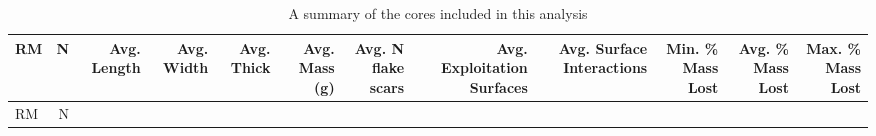 \documentclass[]{elsarticle} %
\begin{document}
\begin{longtable}[]{@{}lrrrrrrrrrrr@{}}
\caption{A summary of the cores included in this analysis
\label{table2}}\tabularnewline
\toprule
\begin{minipage}[b]{0.02\columnwidth}\raggedright
RM\strut
\end{minipage} & \begin{minipage}[b]{0.01\columnwidth}\raggedleft
N\strut
\end{minipage} & \begin{minipage}[b]{0.05\columnwidth}\raggedleft
Avg. Length\strut
\end{minipage} & \begin{minipage}[b]{0.04\columnwidth}\raggedleft
Avg. Width\strut
\end{minipage} & \begin{minipage}[b]{0.04\columnwidth}\raggedleft
Avg. Thick\strut
\end{minipage} & \begin{minipage}[b]{0.05\columnwidth}\raggedleft
Avg. Mass (g)\strut
\end{minipage} & \begin{minipage}[b]{0.07\columnwidth}\raggedleft
Avg. N flake scars\strut
\end{minipage} & \begin{minipage}[b]{0.11\columnwidth}\raggedleft
Avg. Exploitation Surfaces\strut
\end{minipage} & \begin{minipage}[b]{0.10\columnwidth}\raggedleft
Avg. Surface Interactions\strut
\end{minipage} & \begin{minipage}[b]{0.07\columnwidth}\raggedleft
Min. \% Mass Lost\strut
\end{minipage} & \begin{minipage}[b]{0.07\columnwidth}\raggedleft
Avg. \% Mass Lost\strut
\end{minipage} & \begin{minipage}[b]{0.07\columnwidth}\raggedleft
Max. \% Mass Lost\strut
\end{minipage}\tabularnewline
\midrule
\endfirsthead
\toprule
\begin{minipage}[b]{0.02\columnwidth}\raggedright
RM\strut
\end{minipage} & \begin{minipage}[b]{0.01\columnwidth}\raggedleft
N\strut
\end{minipage} & \begin{minipage}[b]{0.05\columnwidth}\raggedleft

\end{minipage}
\end{longtable}
\end{document}
